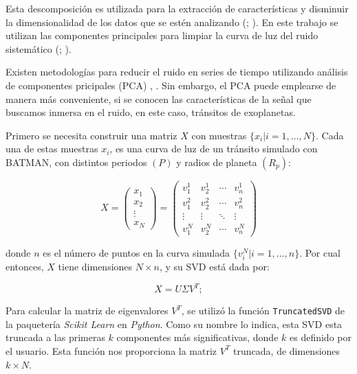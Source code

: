 Esta descomposición es utilizada para la extracción de características y disminuir la dimensionalidad de los datos que se estén analizando (\cite{mcgurk2010principal}; \cite{medeiros2018principal}). En este trabajo se utilizan las componentes principales para limpiar la curva de luz del ruido sistemático (\cite{shin1999iterative}; \cite{bailey2012principal}).

Existen metodologías para reducir el ruido en series de tiempo utilizando análisis de componentes pricipales (PCA) \cite{shin1999iterative}, \cite{bailey2012principal}. Sin embargo, el PCA puede emplearse de manera más conveniente, si se conocen las características de la señal que buscamos inmersa en el ruido, en este caso, tránsitos de exoplanetas.

Primero se necesita construir una matriz $X$ con muestras $\{x_{i}|i=1,...,N\}$. Cada una de estas muestras $x_{i}$, es una curva de luz de un tránsito simulado con BATMAN, con distintos periodos $(P)$ y radios de planeta $(R_{p})$:

\begin{equation}
  X = 
  \begin{pmatrix}
  x_{1} \\
  x_{2}\\
  \vdots  \\
  x_{N}
  \end{pmatrix}=
  \begin{pmatrix}
    v^{1}_{1} & v^{1}_{2} & \cdots & v^{1}_{n} \\
    v^{2}_{1} & v^{2}_{2} & \cdots & v^{2}_{n} \\
    \vdots  & \vdots  & \ddots & \vdots  \\
    v^{N}_{1} & v^{N}_{2} & \cdots & v^{N}_{n} 
  \end{pmatrix}
\end{equation}

donde $n$ es el número de puntos en la curva simulada $\{v^{N}_{i}|i=1,...,n\}$. Por cual entonces, $X$ tiene dimensiones $N\times n$, y su SVD  está dada por:

\begin{equation}
  \displaystyle X=U\Sigma V^{T};
\end{equation}

Para calcular la matriz de eigenvalores $V^{T}$, se utilizó la función \texttt{TruncatedSVD} de la paquetería \textit{Scikit Learn} en \textit{Python}. Como su nombre lo indica, esta SVD esta truncada a las primeras $k$ componentes más significativas, donde $k$  es definido por el usuario. Esta función nos proporciona la matriz $V^{T}$ truncada, de dimensiones $k\times N$.

